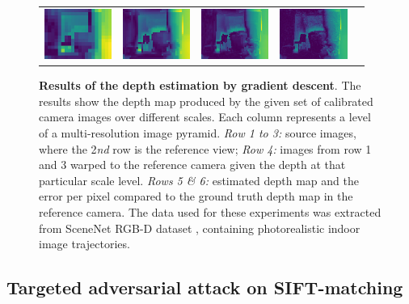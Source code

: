 \begin{figure}
\begin{center}
\begin{tabular}{c c c c c}
        \includegraphics[width=2.2cm]{main/chapter03/data/depth/error_2.jpg} &
        \includegraphics[width=2.2cm]{main/chapter03/data/depth/error_3.jpg} &
        \includegraphics[width=2.2cm]{main/chapter03/data/depth/error_4.jpg} &
        \includegraphics[width=2.2cm]{main/chapter03/data/depth/error_5.jpg} 
        \end{tabular}
    \end{center}
    \caption[Results of the depth estimation by gradient descent]{{\bf Results of the depth estimation by gradient descent}. The results show the depth map produced by the given set of calibrated camera images over different scales. Each column represents a level of a multi-resolution image pyramid. \textit{Row 1 to 3:} source images, where the 2\textit{nd} row is the reference view; \textit{Row 4:} images from row 1 and 3 warped to the reference camera given the depth at that particular scale level. \textit{Rows 5 \& 6:} estimated depth map and the error per pixel compared to the ground truth depth map in the reference camera. The data used for these experiments was extracted from SceneNet RGB-D dataset \citep{McCormac:etal:ICCV2017}, containing photorealistic indoor image trajectories.}
    \label{fig:multiview:depth_estimation}
\end{figure}
%

\subsection{Targeted adversarial attack on SIFT-matching}
\label{section:use_cases:adversarial_matching}

